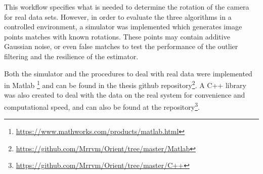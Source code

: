 This workflow specifies what is needed to determine the rotation of the camera for real data sets. However, in order to evaluate the three algorithms in a controlled environment, a simulator was implemented which generates image points matches with known rotations. These points may contain additive Gaussian noise, or even false matches to test the performance of the outlier filtering and the resilience of the estimator. 

Both the simulator and the procedures to deal with real data were implemented in Matlab \footnote{\href{https://www.mathworks.com/products/matlab.html}{https://www.mathworks.com/products/matlab.html}} and can be found in the thesis github repository\footnote{\href{https://github.com/Mrrvm/Orient/tree/master/Matlab}{https://github.com/Mrrvm/Orient/tree/master/Matlab}}. A C++ library was also created to deal with the data on the real system for convenience and computational speed, and can also be found at the repository\footnote{\href{https://github.com/Mrrvm/Orient/tree/master/C++}{https://github.com/Mrrvm/Orient/tree/master/C++}}.

